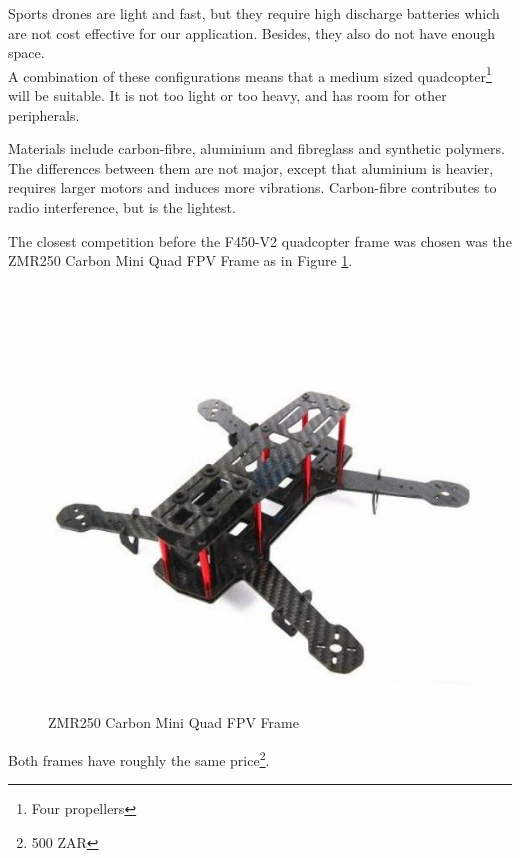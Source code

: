 Sports drones are light and fast, but they require high discharge batteries which are not cost effective for our application. Besides, they also do not have enough space.\\

A combination of these configurations means that a medium sized quadcopter\footnote{Four propellers} will be suitable. It is not too light or too heavy, and has room for other peripherals.

Materials include carbon-fibre, aluminium and fibreglass and synthetic polymers. The differences between them are not major, except that aluminium is heavier, requires larger motors and induces more vibrations. Carbon-fibre contributes to radio interference\cite{frame}, but is the lightest.

The closest competition before the F450-V2 quadcopter frame was chosen was the ZMR250 Carbon Mini Quad FPV Frame as in Figure \ref{fig:zmr}.

\begin{figure}[H]
\centering
\includegraphics[scale=0.35]{images/zmr250.jpeg}
\caption{ZMR250 Carbon Mini Quad FPV Frame \cite{frobot}}
\label{fig:zmr}
\end{figure}

Both frames have roughly the same price\footnote{500 ZAR}.\\


